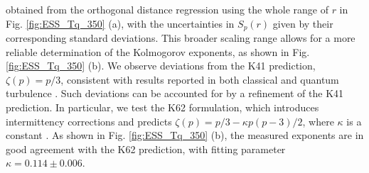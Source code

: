 \documentclass[aps,prl,twocolumn,showpacs,notitlepage,floatfix,superscriptaddress]{revtex4-1}
\begin{document}
obtained from the orthogonal distance regression
using the whole range of $r$ in Fig. \ref{fig:ESS_Tq_350} (a),
with the uncertainties in $S_p(r)$ given by their corresponding standard deviations.
This broader scaling range allows for a more reliable determination of the Kolmogorov exponents, as shown in Fig. \ref{fig:ESS_Tq_350} (b). We observe deviations from the K41 prediction, $\zeta(p) = p/3$,
consistent with results reported in both classical and quantum turbulence \cite{Benzi1993,Krstulovic2016,Zhao25}. Such deviations can be accounted for by a refinement of the K41 prediction. In particular, we test the K62 formulation, which introduces intermittency corrections and predicts $\zeta(p) = p / 3 - \kappa p (p - 3) / 2$,
where $\kappa$ is a constant \cite{Kolmogorov_1962}.
As shown in Fig. \ref{fig:ESS_Tq_350} (b), the measured exponents are in good agreement with the K62 prediction, with fitting parameter $\kappa = 0.114 \pm 0.006$.
\end{document}
